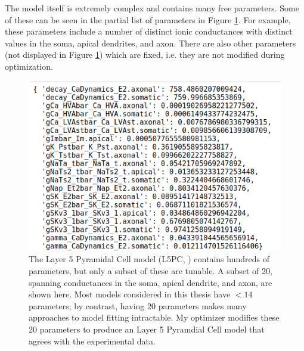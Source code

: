 
The model itself is extremely complex and contains many free parameters.
Some of these can be seen in the partial list of parameters in Figure \ref{fig:ca1_parameters}.
For example, these parameters include a number of distinct ionic conductances with distinct values in the soma, apical dendrites, and axon.
There are also other parameters (not displayed in Figure \ref{fig:ca1_parameters}) which are fixed, i.e. they are not modified during optimization.

\begin{figure}
    \begin{center}
    \includegraphics{figures/parameters_opt_l5pc.png}
    \caption[Subset of model parameters in the conductance-based L5PC neuron]{The Layer 5 Pyramidal Cell model (L5PC, \citep{van2016bluepyopt}) contains hundreds of parameters, but only a subset of these are tunable.
    A subset of 20, spanning conductances in the soma, apical dendrite, and axon, are shown here.
    Most models considered in this thesis have $<14$ parameters; by contrast, having 20 parameters makes many approaches to model fitting intractable.
    My optimizer modifies these 20 parameters to produce an Layer 5 Pyramdial Cell model that agrees with the experimental data.}
    \label{fig:ca1_parameters}
    \end{center}
\end{figure}

